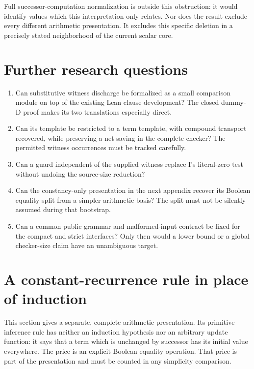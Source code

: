 \documentclass[11pt]{article}
\theoremstyle{definition}\newtheorem{definition}[theorem]{Definition}
\begin{document}
Full successor-computation normalization is outside this obstruction:
it would identify values which this interpretation only relates.
Nor does the result exclude every different arithmetic presentation.
It excludes this specific deletion in a precisely stated neighborhood
of the current scalar core.

\section{Further research questions}

\begin{enumerate}
\item Can substitutive witness discharge be formalized as a small
comparison module on top of the existing Lean clause development?
The closed dummy-D proof makes its two translations especially direct.
\item Can its template be restricted to a term template, with compound
transport recovered, while preserving a net saving in the complete
checker? The permitted witness occurrences must be tracked carefully.
\item Can a guard independent of the supplied witness replace I's
literal-zero test without undoing the source-size reduction?
\item Can the constancy-only presentation in the next appendix recover
its Boolean equality split from a simpler arithmetic basis? The split
must not be silently assumed during that bootstrap.
\item Can a common public grammar and malformed-input contract be fixed
for the compact and strict interfaces? Only then would a lower bound
or a global checker-size claim have an unambiguous target.
\end{enumerate}

\appendix
\section{A constant-recurrence rule in place of induction}
\label{sec:constancy-with-split}

This section gives a separate, complete arithmetic presentation.  Its
primitive inference rule has neither an induction hypothesis nor an
arbitrary update function: it says that a term which is unchanged by
successor has its initial value everywhere.  The price is an explicit
Boolean equality operation.  That price is part of the presentation and
must be counted in any simplicity comparison.
\end{document}
